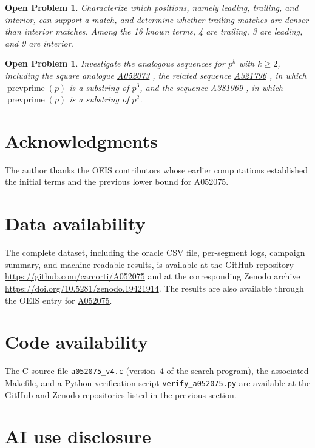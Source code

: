 \documentclass[12pt,reqno]{article}
\theoremstyle{plain}
\newtheorem{openproblem}[theorem]{Open Problem}
\theoremstyle{definition}
\theoremstyle{remark}
\newcommand{\prevprime}{\operatorname{prevprime}}
\newcommand{\seqnum}[1]{\href{https://oeis.org/#1}{\rm \underline{#1}}}
\begin{document}
\begin{openproblem}
\label{op:positions}
Characterize which positions, namely leading, trailing, and interior,
can support a match, and determine whether trailing matches are denser
than interior matches.
Among the 16 known terms, 4 are trailing, 3 are leading, and
9 are interior.
\end{openproblem}

\begin{openproblem}
\label{op:analogues}
Investigate the analogous sequences for $p^k$ with $k \geq 2$,
including the square analogue
\seqnum{A052073} \cite{OEIS_A052073},
the related sequence \seqnum{A321796} \cite{OEIS_A321796},
in which $\prevprime(p)$ is a substring of $p^3$,
and the sequence \seqnum{A381969} \cite{OEIS_A381969},
in which $\prevprime(p)$ is a substring of $p^2$.
\end{openproblem}

\section{Acknowledgments}

The author thanks the OEIS contributors whose earlier computations
established the initial terms and the previous lower bound for
\seqnum{A052075}.

\section{Data availability}

The complete dataset, including the oracle CSV file, per-segment logs,
campaign summary, and machine-readable results, is available at
the GitHub repository
\url{https://github.com/carcorti/A052075}
and at the corresponding Zenodo archive
\url{https://doi.org/10.5281/zenodo.19421914}.
The results are also available through the OEIS entry
for \seqnum{A052075}.

\section{Code availability}

The C source file \texttt{a052075\_v4.c} (version~4 of the search
program), the associated Makefile, and a Python verification script
\texttt{verify\_a052075.py} are available at the GitHub and Zenodo
repositories listed in the previous section.

\section{AI use disclosure}
\end{document}
